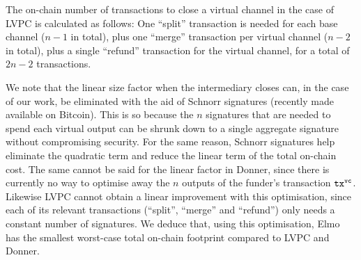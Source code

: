  The on-chain number of transactions to close a virtual channel in the case of
  LVPC is calculated as follows: One ``split'' transaction is needed for each
  base channel ($n-1$ in total), plus one ``merge'' transaction per virtual
  channel ($n-2$ in total), plus a single ``refund'' transaction for the virtual
  channel, for a total of $2n-2$ transactions.

  We note that the linear size factor when the intermediary closes can, in the
  case of our work, be eliminated with the aid of Schnorr signatures (recently
  made available on Bitcoin). This is so because the $n$ signatures that are
  needed to spend each virtual output can be shrunk down to a single aggregate
  signature without compromising security. For the same reason, Schnorr
  signatures help eliminate the quadratic term and reduce the linear term of the
  total on-chain cost. The same cannot be said for the linear factor in Donner,
  since there is currently no way to optimise away the $n$ outputs of the
  funder's transaction $\texttt{tx}^{\mathtt{vc}}$. Likewise LVPC cannot obtain a linear
  improvement with this optimisation, since each of its relevant transactions
  (``split'', ``merge'' and ``refund'') only needs a constant number of
  signatures. We deduce that, using this optimisation, Elmo has the smallest
  worst-case total on-chain footprint compared to LVPC and Donner.
